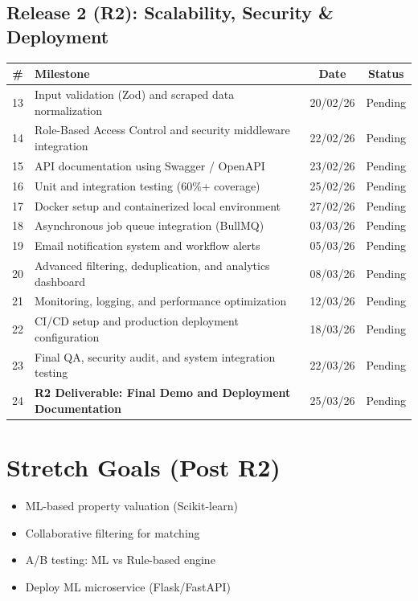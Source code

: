 \documentclass[12pt,a4paper]{article}
\begin{document}
\subsection*{Release 2 (R2): Scalability, Security \& Deployment}

\begin{center}
\begin{tabular}{|c|p{8cm}|c|c|}
\hline
\textbf{\#} & \textbf{Milestone} & \textbf{Date} & \textbf{Status} \\
\hline
13 & Input validation (Zod) and scraped data normalization & 20/02/26 & Pending \\
\hline
14 & Role-Based Access Control and security middleware integration & 22/02/26 & Pending \\
\hline
15 & API documentation using Swagger / OpenAPI & 23/02/26 & Pending \\
\hline
16 & Unit and integration testing (60\%+ coverage) & 25/02/26 & Pending \\
\hline
17 & Docker setup and containerized local environment & 27/02/26 & Pending \\
\hline
18 & Asynchronous job queue integration (BullMQ) & 03/03/26 & Pending \\
\hline
19 & Email notification system and workflow alerts & 05/03/26 & Pending \\
\hline
20 & Advanced filtering, deduplication, and analytics dashboard & 08/03/26 & Pending \\
\hline
21 & Monitoring, logging, and performance optimization & 12/03/26 & Pending \\
\hline
22 & CI/CD setup and production deployment configuration & 18/03/26 & Pending \\
\hline
23 & Final QA, security audit, and system integration testing & 22/03/26 & Pending \\
\hline
24 & \textbf{R2 Deliverable: Final Demo and Deployment Documentation} & 25/03/26 & Pending \\
\hline
\end{tabular}
\end{center}


\section*{Stretch Goals (Post R2)}

\begin{itemize}
    \item ML-based property valuation (Scikit-learn)
    \item Collaborative filtering for matching
    \item A/B testing: ML vs Rule-based engine
    \item Deploy ML microservice (Flask/FastAPI)
\end{itemize}
\end{document}
